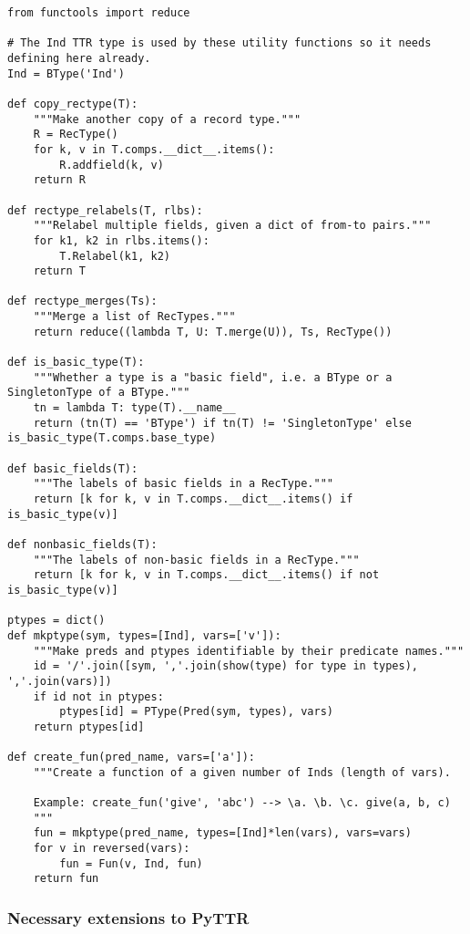 \begin{lstlisting}[label=lst:utility,caption=Utility functions]
from functools import reduce

# The Ind TTR type is used by these utility functions so it needs defining here already.
Ind = BType('Ind')
    
def copy_rectype(T):
    """Make another copy of a record type."""
    R = RecType()
    for k, v in T.comps.__dict__.items():
        R.addfield(k, v)
    return R

def rectype_relabels(T, rlbs):
    """Relabel multiple fields, given a dict of from-to pairs."""
    for k1, k2 in rlbs.items():
        T.Relabel(k1, k2)
    return T

def rectype_merges(Ts):
    """Merge a list of RecTypes."""
    return reduce((lambda T, U: T.merge(U)), Ts, RecType())

def is_basic_type(T):
    """Whether a type is a "basic field", i.e. a BType or a SingletonType of a BType."""
    tn = lambda T: type(T).__name__
    return (tn(T) == 'BType') if tn(T) != 'SingletonType' else is_basic_type(T.comps.base_type)

def basic_fields(T):
    """The labels of basic fields in a RecType."""
    return [k for k, v in T.comps.__dict__.items() if is_basic_type(v)]

def nonbasic_fields(T):
    """The labels of non-basic fields in a RecType."""
    return [k for k, v in T.comps.__dict__.items() if not is_basic_type(v)]

ptypes = dict()
def mkptype(sym, types=[Ind], vars=['v']):
    """Make preds and ptypes identifiable by their predicate names."""
    id = '/'.join([sym, ','.join(show(type) for type in types), ','.join(vars)])
    if id not in ptypes:
        ptypes[id] = PType(Pred(sym, types), vars)
    return ptypes[id]

def create_fun(pred_name, vars=['a']):
    """Create a function of a given number of Inds (length of vars).
    
    Example: create_fun('give', 'abc') --> \a. \b. \c. give(a, b, c)
    """
    fun = mkptype(pred_name, types=[Ind]*len(vars), vars=vars)
    for v in reversed(vars):
        fun = Fun(v, Ind, fun)
    return fun
\end{lstlisting}

\subsubsection{Necessary extensions to PyTTR}

